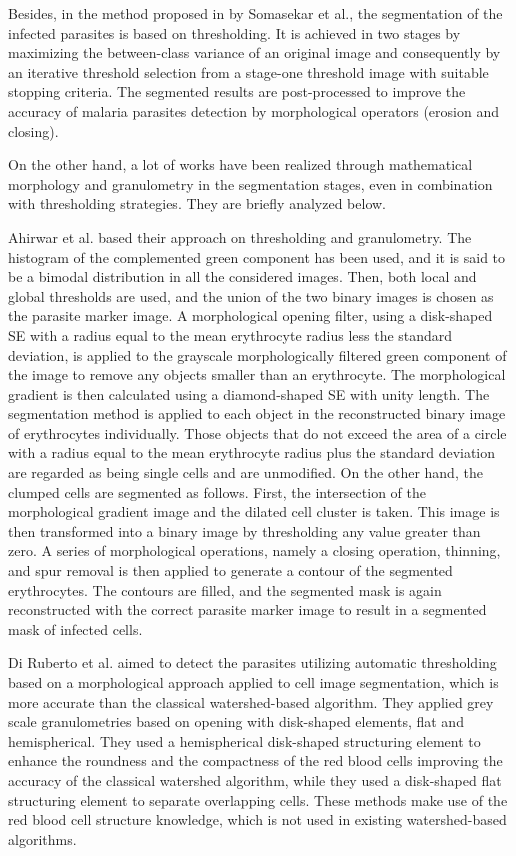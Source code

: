 Besides, in the method proposed in \cite{Somasekar2017} by Somasekar et al., the segmentation of the infected parasites is based on thresholding. It is achieved in two stages by maximizing the between-class variance of an original image and consequently by an iterative threshold selection from a stage-one threshold image with suitable stopping criteria. The segmented results are post-processed to improve the accuracy of malaria parasites detection by morphological operators (erosion and closing).

On the other hand, a lot of works have been realized through mathematical morphology and granulometry in the segmentation stages, even in combination with thresholding strategies. They are briefly analyzed below.

Ahirwar et al. \cite{Ahirwar2012} based their approach on thresholding and granulometry. The histogram of the complemented green component has been used, and it is said to be a bimodal distribution in all the considered images. Then, both local and global thresholds are used, and the union of the two binary images is chosen as the parasite marker image. A morphological opening filter, using a disk-shaped SE with a radius equal to the mean erythrocyte radius less the standard deviation, is applied to the grayscale morphologically filtered green component of the image to remove any objects smaller than an erythrocyte. The morphological gradient is then calculated using a diamond-shaped SE with unity length. The segmentation method is applied to each object in the reconstructed binary image of erythrocytes individually. Those objects that do not exceed the area of a circle with a radius equal to the mean erythrocyte radius plus the standard deviation are regarded as being single cells and are unmodified.
On the other hand, the clumped cells are segmented as follows. First, the intersection of the morphological gradient image and the dilated cell cluster is taken. This image is then transformed into a binary image by thresholding any value greater than zero. A series of morphological operations, namely a closing operation, thinning, and spur removal is then applied to generate a contour of the segmented erythrocytes. The contours are filled, and the segmented mask is again reconstructed with the correct parasite marker image to result in a segmented mask of infected cells.

Di Ruberto et al. \cite{DiRuberto2002} aimed to detect the parasites utilizing automatic thresholding based on a morphological approach applied to cell image segmentation, which is more accurate than the classical watershed-based algorithm. They applied grey scale granulometries based on opening with disk-shaped elements, flat and hemispherical. They used a hemispherical disk-shaped structuring element to enhance the roundness and the compactness of the red blood cells improving the accuracy of the classical watershed algorithm, while they used a disk-shaped flat structuring element to separate overlapping cells. These methods make use of the red blood cell structure knowledge, which is not used in existing watershed-based algorithms.


